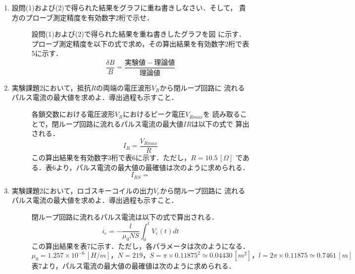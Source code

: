 \begin{enumerate}
    \item 設問(1)および(2)で得られた結果をグラフに重ね書きしなさい．そして，
    貴方のプローブ測定精度を有効数字2桁で示せ．
    \begin{description}
        \item[] 設問(1)および(2)で得られた結果を重ね書きしたグラフを図 に示す．
        プローブ測定精度を以下の式で求め，その算出結果を有効数字2桁で表5に示す．
        $$
        \frac{\delta B}{B}=\frac{実験値-理論値}{理論値}
        $$
    \end{description}

    \item 実験課題2において，抵抗$R$の両端の電圧波形$V_R$から閉ループ回路に
    流れるパルス電流の最大値を求めよ．導出過程も示すこと．
    \begin{description}
        \item[] 各鎖交数における電圧波形$V_R$におけるピーク電圧$V_{Rmax}$を
        読み取ることで，閉ループ回路に流れるパルス電流の最大値$IR$は以下の式で
        算出される．
        $$
        I_R=\frac{V_{Rmax}}{R}
        $$
        この算出結果を有効数字3桁で表6に示す．ただし，$R= 10.5\,[\Omega]$
        である．表6より，パルス電流の最大値の最確値は次のように求められる．
        $$
        I_{RS}=
        $$
    \end{description}
    
    \item 実験課題2において，ロゴスキーコイルの出力$V_e$から閉ループ回路に
    流れるパルス電流の最大値を求めよ．導出過程も示すこと．
    \begin{description}
        \item[] 閉ループ回路に流れるパルス電流は以下の式で算出される．
        $$
        i_e=-\frac{l}{\mu_0 NS}\int_{0}^{t}V_e(t)dt
        $$
        この算出結果を表7に示す．ただし，各パラメータは次のようになる．
        $$
        \mu_0=1.257\times 10^{-6}\,[\si{H/m}]，N=219，S=\pi\times 0.11875^2\simeq 0.04430\,[\si{m^2}]，l=2\pi\times 0.11875\simeq 0.7461\,[\si{m}]
        $$
        表7より，パルス電流の最大値の最確値は次のように求められる．
    \end{description}
    
\end{enumerate}
